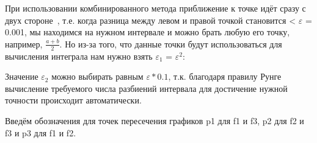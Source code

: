 \documentclass[a4paper,12pt,titlepage,finall]{article}
\begin{document}
При использовании комбинированного метода приближение к точке идёт сразу с двух стороне~\cite{math}, т.е. когда разница между левом и правой точкой становится < $\varepsilon$ = 0.001, мы находимся на нужном интервале и можно брать любую его точку, например, $\frac{a+b}{2}$. Но из-за того, что данные точки будут использоваться для вычисления интеграла нам нужно взять $\varepsilon_1$ =  $\varepsilon^2:$

Значение $\varepsilon_2$ можно выбирать равным $\varepsilon*0.1$, т.к. благодаря правилу Рунге~\cite{method} вычисление требуемого числа разбиений интервала для достичение нужной точности происходит автоматически.

Введём обозначения для точек пересечения графиков p1 для f1 и f3, p2 для f2 и f3 и p3 для f1 и f2.

\begin{figure}[h]
\centering
{}
\end{figure}
\end{document}
